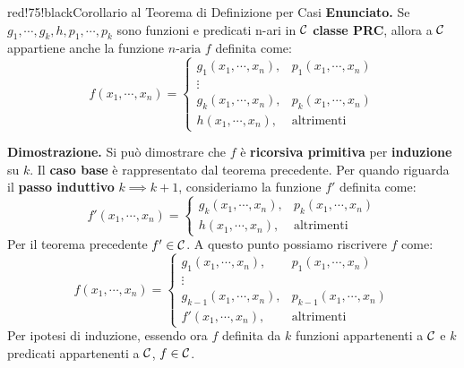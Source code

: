 \newpage

\begin{halfframedbox}{red!75!black}{Corollario al Teorema di Definizione per Casi}\label{Corollario al Teorema di Definizione per Casi}
  \textbf{Enunciato.} Se \(g_1,\cdots,g_k,h,p_1,\cdots,p_k\) sono funzioni e predicati n-ari in \(\mathcal{C}\) \textbf{classe PRC}, allora a \(\mathcal{C}\) appartiene anche la funzione \(n\text{-aria}\) \(f\) definita come:
  \begin{equation}
    f(x_1,\cdots,x_n)=\begin{cases}
                    g_1(x_1,\cdots,x_n), & p_1(x_1,\cdots,x_n)\\
                    \vdots \\
                    g_k(x_1,\cdots,x_n), & p_k(x_1,\cdots,x_n)\\
                    h(x_1,\cdots,x_n), & \text{altrimenti}
                    \end{cases}
  \end{equation}

  \begin{center}
    \textcolor{red!75!black}{\hdashrule[0.5ex]{18cm}{1pt}{3mm 3pt 1mm 2pt}}
  \end{center}

  \textbf{Dimostrazione.} Si può dimostrare che \(f\) è \textbf{ricorsiva primitiva} per \textbf{induzione} su \(k\). Il \textbf{caso base} è rappresentato dal teorema precedente.
  Per quando riguarda il \textbf{passo induttivo} \(k\implies k+1\), consideriamo la funzione \(f'\) definita come:
    \begin{equation}
      f'(x_1,\cdots,x_n)=\begin{cases}
                      g_k(x_1,\cdots,x_n), & p_k(x_1,\cdots,x_n)\\
                      h(x_1,\cdots,x_n), & \text{altrimenti}
                      \end{cases}
    \end{equation}
    Per il teorema precedente \(f' \in \mathcal{C}\).
    A questo punto possiamo riscrivere \(f\) come:
    \begin{equation}
      f(x_1,\cdots,x_n)=\begin{cases}
                      g_1(x_1,\cdots,x_n), & p_1(x_1,\cdots,x_n)\\
                      \vdots\\
                      g_{k-1}(x_1,\cdots,x_n), & p_{k-1}(x_1,\cdots,x_n)\\
                      f'(x_1,\cdots,x_n), & \text{altrimenti}
                      \end{cases}
    \end{equation}
    Per ipotesi di induzione, essendo ora \(f\) definita da \(k\) funzioni appartenenti a \(\mathcal{C}\) e \(k\) predicati appartenenti a \(\mathcal{C}\), \(f \in \mathcal{C}\).
  \end{halfframedbox}

